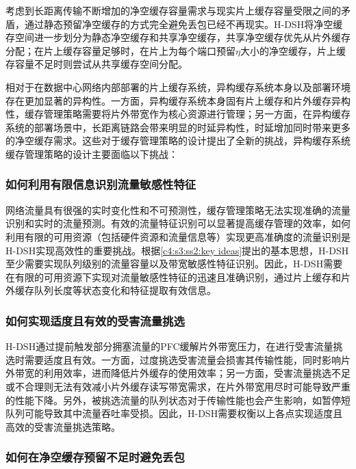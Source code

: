 考虑到长距离传输不断增加的净空缓存容量需求与现实片上缓存容量受限之间的矛盾，通过静态预留净空缓存的方式完全避免丢包已经不再现实。H-DSH将净空缓存空间进一步划分为静态净空缓存和共享净空缓存，共享净空缓存优先从片外缓存分配；在片上缓存容量足够时，在片上为每个端口预留$\eta$大小的净空缓存，片上缓存容量不足时则尝试从共享缓存空间分配。


相对于在数据中心网络内部部署的片上缓存系统，异构缓存系统本身以及部署环境存在更加显著的异构性。一方面，异构缓存系统本身固有片上缓存和片外缓存异构性，缓存管理策略需要将片外带宽作为核心资源进行管理；另一方面，在异构缓存系统的部署场景中，长距离链路会带来明显的时延异构性，时延增加同时带来更多的净空缓存需求。这些对于缓存管理策略的设计提出了全新的挑战，异构缓存系统缓存管理策略的设计主要面临以下挑战：

\subsubsection{如何利用有限信息识别流量敏感性特征}

网络流量具有很强的实时变化性和不可预测性，缓存管理策略无法实现准确的流量识别和实时的流量预测。有效的流量特征识别可以显著提高缓存管理的效率，如何利用有限的可用资源（包括硬件资源和流量信息等）实现更高准确度的流量识别是H-DSH实现高效性的重要挑战。根据\ref{c4:s3:ss2:key ideas}提出的基本思想，H-DSH至少需要实现队列级别的流量容量以及带宽敏感性特征识别。因此，H-DSH需要在有限的可用资源下实现对流量敏感性特征的迅速且准确识别，通过片上缓存和片外缓存队列长度等状态变化和特征提取有效信息。

\subsubsection{如何实现适度且有效的受害流量挑选}

H-DSH通过提前触发部分拥塞流量的PFC缓解片外带宽压力，在进行受害流量挑选时需要适度且有效。一方面，过度挑选受害流量会损害其传输性能，同时影响片外带宽的利用效率，进而降低片外缓存的使用效率；另一方面，受害流量挑选不足或不合理则无法有效减小片外缓存读写带宽需求，在片外带宽用尽时可能导致严重的性能下降。另外，被挑选流量的队列状态对于传输性能也会产生影响，如暂停短队列可能导致其中流量吞吐率受损。因此，H-DSH需要权衡以上各点实现适度且高效的受害流量挑选策略。

\subsubsection{如何在净空缓存预留不足时避免丢包}

